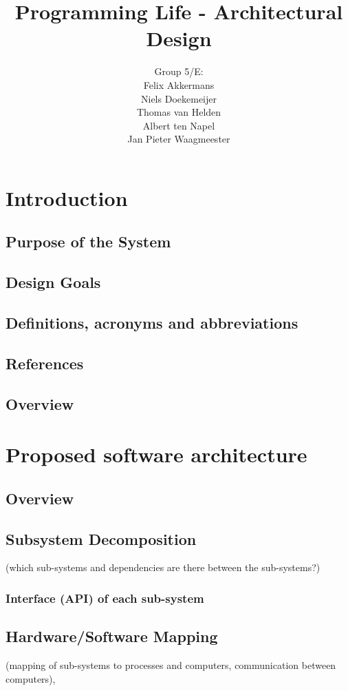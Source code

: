 \documentclass[a4paper]{article}
\title{Programming Life - Architectural Design }
\author{Group 5/E:\\
Felix Akkermans \\
Niels Doekemeijer \\
Thomas van Helden \\
Albert ten Napel \\
Jan Pieter Waagmeester}
\begin{document}
\maketitle

\vfill

\small{\tableofcontents}
\pagebreak
\section{Introduction}
\subsection{Purpose of the System}
\subsection{Design Goals}
\subsection{Definitions, acronyms and abbreviations}
\subsection{References}
\subsection{Overview}

\section{Proposed software architecture}
\subsection{Overview}
\subsection{Subsystem Decomposition}
(which sub-systems and dependencies are there between the sub-systems?)

\subsubsection{Interface (API) of each sub-system}
\subsection{Hardware/Software Mapping}
(mapping of sub-systems to processes and computers, communication between computers),
\end{document}
